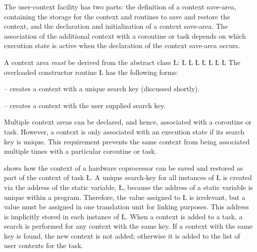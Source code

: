 \documentclass[openright,twoside]{report}
\begin{document}
The user-context facility has two parts: the definition of a context save-area, containing the storage for the context and routines to save and restore the context, and the declaration and initialization of a context save-area.
The association of the additional context with a coroutine or task depends on which execution state is active when the declaration of the context save-area occurs.

A context area \emph{must} be derived from the abstract class \LGinlinetrue\LGbegin\lgrinde\L{}\endlgrinde\LGend{}:
\LGinlinefalse\LGbegin\lgrinde
\L{}
\L{}
\L{\LB{}}
\L{\LB{}}
\L{\LB{}}
\L{\LB{}}
\L{}
\CE{}\endlgrinde\LGend
The overloaded constructor routine \LGinlinetrue\LGbegin\lgrinde\L{}\endlgrinde\LGend{} has the following forms:
\begin{prefix}
\item[\LGinlinetrue\LGbegin\lgrinde\L{\LB{\V{uContext}()}}\endlgrinde\LGend{}]
-- creates a context with a unique search key (discussed shortly).

\item[\LGinlinetrue\LGbegin\lgrinde\L{\LB{\V{uContext}(\0\K{void}\0\*\V{key}\0)}}\endlgrinde\LGend{}]
-- creates a context with the user supplied search key.
\end{prefix}
Multiple context areas can be declared, and hence, associated with a coroutine or task.
However, a context is only associated with an execution state if its search key is unique.
This requirement prevents the same context from being associated multiple times with a particular coroutine or task.

 shows how the context of a hardware coprocessor can be saved and restored as part of the context of task \LGinlinetrue\LGbegin\lgrinde\L{}\endlgrinde\LGend{}.
A unique search-key for all instances of \LGinlinetrue\LGbegin\lgrinde\L{}\endlgrinde\LGend{} is created via the address of the static variable, \LGinlinetrue\LGbegin\lgrinde\L{}\endlgrinde\LGend{}, because the address of a static variable is unique within a program.
Therefore, the value assigned to \LGinlinetrue\LGbegin\lgrinde\L{}\endlgrinde\LGend{} is irrelevant, but a value must be assigned in one translation unit for linking purposes.
This address is implicitly stored in each instance of \LGinlinetrue\LGbegin\lgrinde\L{}\endlgrinde\LGend{}.
When a context is added to a task, a search is performed for any context with the same key.
If a context with the same key is found, the new context is not added;
otherwise it is added to the list of user contexts for the task.
\end{document}
